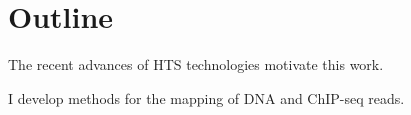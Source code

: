 
\section{Outline}

The recent advances of HTS technologies motivate this work.

I develop methods for the mapping of DNA and ChIP-seq reads.
